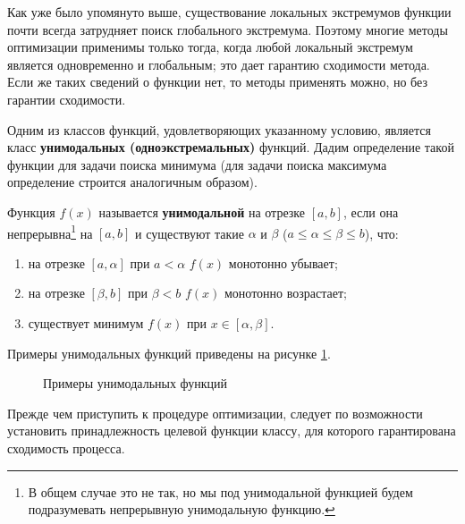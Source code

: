 \documentclass[a4paper,12pt]{report}
\begin{document}
Как уже было упомянуто выше, существование локальных экстремумов функции почти всегда затрудняет поиск глобального экстремума. Поэтому многие методы оптимизации применимы только тогда, когда любой локальный экстремум является одновременно и глобальным; это дает гарантию сходимости метода. Если же таких сведений о функции нет, то методы применять можно, но без гарантии сходимости.

Одним из классов функций, удовлетворяющих указанному условию, является класс \textbf{унимодальных (одноэкстремальных)} функций. Дадим определение такой функции для задачи поиска минимума (для задачи поиска максимума определение строится аналогичным образом).

Функция $f(x)$ называется \textbf{унимодальной} на отрезке $\left[a, b\right]$, если она непрерывна\footnote[1]{В общем случае это не так, но мы под унимодальной функцией будем подразумевать непрерывную унимодальную функцию.} на $\left[a, b\right]$ и существуют такие $\alpha$ и $\beta$ ($a \leq \alpha \leq \beta \leq b$), что:
\begin{enumerate}
\item на отрезке $\left[a, \alpha\right]$ при $a < \alpha$ $f(x)$ монотонно убывает;
\item на отрезке $\left[\beta, b\right]$ при $\beta < b$ $f(x)$ монотонно возрастает;
\item существует минимум $f(x)$ при $x \in \left[\alpha, \beta\right]$.
\end{enumerate}
Примеры унимодальных функций приведены на рисунке \ref{fig:unimod_example}.

\newpage

\begin{figure}[ht]
\caption{Примеры унимодальных функций}
\label{fig:unimod_example}
\end{figure}

Прежде чем приступить к процедуре оптимизации, следует по возможности установить принадлежность целевой функции классу, для которого гарантирована сходимость процесса.
\end{document}

